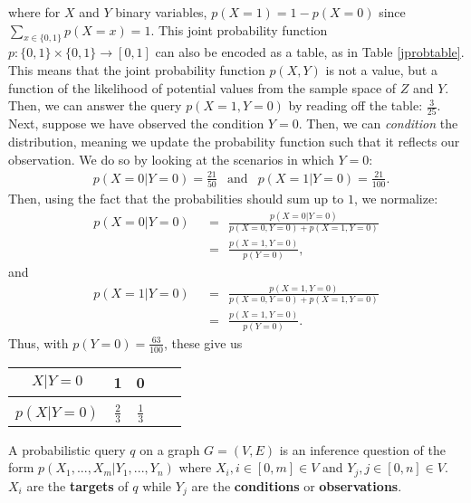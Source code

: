 \begin{example}
where for $X$ and $Y$ binary variables, $p(X=1) = 1-p(X=0)$ since $\sum_{x\in\{0,1\}}p(X=x) = 1$. This joint probability function $p:\{0,1\} \times \{0,1\} \rightarrow [0,1]$ can also be encoded as a table, as in Table \ref{jprobtable}.\newline
\null \quad \quad This means that the joint probability function $p(X,Y)$ is not a value, but a function of the likelihood of potential values from the sample space of $Z$ and $Y$. Then, we can answer the query $p(X=1,Y=0)$ by reading off the table: $\frac{3}{25}$. \newline
\null \quad \quad Next, suppose we have observed the condition $Y=0$. Then, we can \textit{condition} the distribution, meaning we update the probability function such that it reflects our observation. We do so by looking at the scenarios in which $Y=0$:
\begin{align*}
	&p(X=0|Y=0) = \frac{21}{50}	& \text{and} &p(X=1|Y=0) = \frac{21}{100}.
\end{align*}
Then, using the fact that the probabilities should sum up to $1$,  we normalize:
\begin{align*}
p(X=0|Y=0) & \ \ = \ \ \frac{p(X=0|Y=0)}{p(X=0,Y=0) + p(X=1,Y=0)} \\[2em]
& \ \ = \ \ \frac{p(X=1,Y=0)}{p(Y=0)},
\end{align*}
and
\begin{align*}
p(X=1|Y=0) & \ \ = \ \ \frac{p(X=1,Y=0)}{p(X=0,Y=0) + p(X=1,Y=0)} \\[2em]
& \ \ = \ \ \frac{p(X=1,Y=0)}{p(Y=0)}.
\end{align*}
Thus, with $p(Y=0) = \frac{63}{100}$, these give us

\begin{table}[h!]
  \begin{center}
    \begin{tabular}{  c | c c c c }
	$X|Y=0$ 		& 1 & 0  \\
		\hline \\[-1em]
	$p(X|Y=0)$		& $\frac{2}{3}$  & $\frac{1}{3}$  \\
    \end{tabular}
  \end{center}
  \end{table}
\end{example}

\begin{definition}
A probabilistic query $q$ on a graph $G=(V,E)$ is an inference question of the form $p(X_{1}, ..., X_{m}|Y_{1}, ..., Y_{n})$ where $X_{i}, i \in [0,m] \in V$ and $Y_{j}, j \in [0,n] \in V.$ $X_{i}$ are the \textbf{targets} of $q$ while $Y_{j}$ are the \textbf{conditions} or \textbf{observations}. 
\end{definition}

